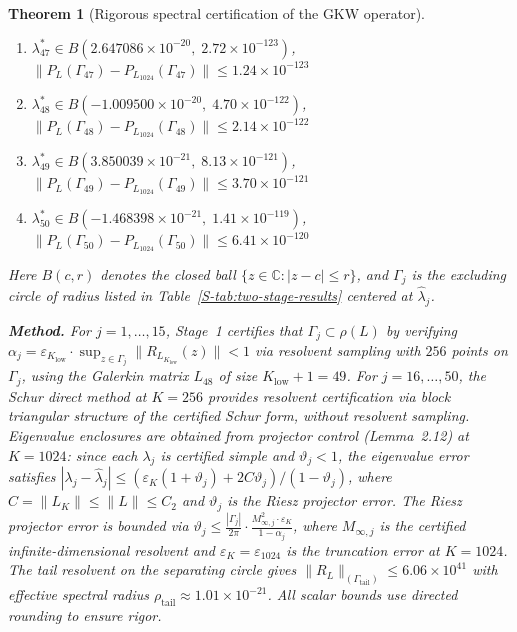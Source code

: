 \documentclass[11pt]{article}
\newtheorem{theorem}{Theorem}
\begin{document}
\begin{theorem}[Rigorous spectral certification of the GKW operator]
\begin{enumerate}
\item $\lambda_{47}^* \in B(2.647086 \times 10^{-20},\; 2.72 \times 10^{-123})$, \quad $\|P_L(\Gamma_{47}) - P_{L_{1024}}(\Gamma_{47})\| \leq 1.24 \times 10^{-123}$
\item $\lambda_{48}^* \in B(-1.009500 \times 10^{-20},\; 4.70 \times 10^{-122})$, \quad $\|P_L(\Gamma_{48}) - P_{L_{1024}}(\Gamma_{48})\| \leq 2.14 \times 10^{-122}$
\item $\lambda_{49}^* \in B(3.850039 \times 10^{-21},\; 8.13 \times 10^{-121})$, \quad $\|P_L(\Gamma_{49}) - P_{L_{1024}}(\Gamma_{49})\| \leq 3.70 \times 10^{-121}$
\item $\lambda_{50}^* \in B(-1.468398 \times 10^{-21},\; 1.41 \times 10^{-119})$, \quad $\|P_L(\Gamma_{50}) - P_{L_{1024}}(\Gamma_{50})\| \leq 6.41 \times 10^{-120}$
\end{enumerate}
Here $B(c, r)$ denotes the closed ball $\{z \in \mathbb{C} : |z - c| \leq r\}$,
and $\Gamma_j$ is the excluding circle of radius listed in Table~\ref{S-tab:two-stage-results}
centered at $\hat\lambda_j$.

\medskip\noindent
\textbf{Method.}
For $j = 1, \ldots, 15$, Stage~1 certifies that $\Gamma_j \subset \rho(L)$ by verifying
$\alpha_j = \varepsilon_{K_{\mathrm{low}}} \cdot
  \sup_{z \in \Gamma_j}\|R_{L_{K_{\mathrm{low}}}}(z)\| < 1$
via resolvent sampling with $256$ points on $\Gamma_j$, using the Galerkin matrix
$L_{48}$ of size $K_{\mathrm{low}} + 1 = 49$.
For $j = 16, \ldots, 50$, the Schur direct method at $K = 256$ provides resolvent certification
via block triangular structure of the certified Schur form, without resolvent sampling.
Eigenvalue enclosures are obtained from projector control
(Lemma~2.12) at $K = 1024$:
since each $\lambda_j$ is certified simple and $\vartheta_j < 1$,
the eigenvalue error satisfies
$|\lambda_j - \hat\lambda_j| \leq (\varepsilon_K(1 + \vartheta_j) + 2C\vartheta_j)/(1 - \vartheta_j)$,
where $C = \|L_K\| \leq \|L\| \leq C_2$
and $\vartheta_j$ is the Riesz projector error.
The Riesz projector error is bounded via
$\vartheta_j \leq \frac{|\Gamma_j|}{2\pi} \cdot
\frac{M_{\infty,j}^2 \cdot \varepsilon_K}{1 - \alpha_j}$,
where $M_{\infty,j}$ is the certified infinite-dimensional resolvent
and $\varepsilon_K = \varepsilon_{1024}$ is the truncation error at $K = 1024$.
The tail resolvent on the separating circle gives
$\|R_L\|_{(\Gamma_{\mathrm{tail}})} \leq 6.06 \times 10^{41}$
with effective spectral radius $\rho_{\mathrm{tail}} \approx 1.01 \times 10^{-21}$.
All scalar bounds use directed rounding to ensure rigor.
\end{theorem}
\end{document}
